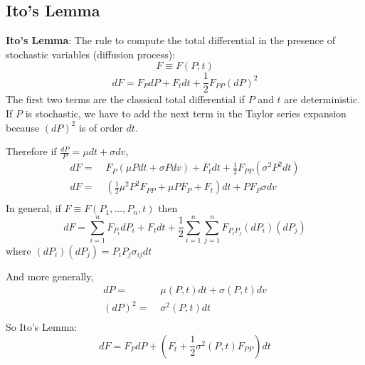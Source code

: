 \documentclass[
14pt,notheorems,hyperref={pdfauthor=whatever}
]{beamer}
\begin{document}

\subsection{Ito's Lemma}
\begin{frame}
\textbf{Ito's Lemma}: The rule to compute the total differential in the presence of stochastic variables (diffusion process):
\[F \equiv F(P;t)\]
\[dF = F_P dP + F_t dt + \frac{1}{2} F_{PP}(dP)^2\]
The first two terms are the classical total differential if $P$ and $t$ are deterministic.\\
\hfill\break
If $P$ is stochastic, we have to add the next term in the Taylor series expansion because $(dP)^2$ is of order $dt$.
\end{frame}

\begin{frame}
Therefore if $\frac{dP}{P} = \mu dt + \sigma dv$,\\
\begin{align*}
    dF =&\; F_P(\mu P dt + \sigma P dv)+F_t dt + \frac{1}{2} F_{PP}(\sigma^2 P^2 dt)\\
    dF =&\; (\frac{1}{2} \mu^2P^2 F_{PP}+\mu P F_P+F_t)dt+P F_P \sigma dv\\
\end{align*}
In general, if $F \equiv F(P_1,...,P_n,t)$ then\\
\[dF = \sum_{i=1}^n F_{P_i}dP_i + F_tdt + \frac{1}{2} \sum_{i=1}^n\sum_{j=1}^n F_{P_iP_j}(dP_i)(dP_j)\]
where $(dP_i)(dP_j) = P_i P_j \sigma_{ij} dt$\\
\end{frame}

\begin{frame}
And more generally,
\begin{align*}
    dP =&\; \mu(P,t) dt + \sigma(P,t) dv\\
    (dP)^2 =&\; \sigma^2(P,t) dt\\
\end{align*}
So  Ito's Lemma:
\[dF = F_P dP + (F_t + \frac{1}{2} \sigma^2(P,t)F_{PP})dt\]
\end{frame}
\end{document}
